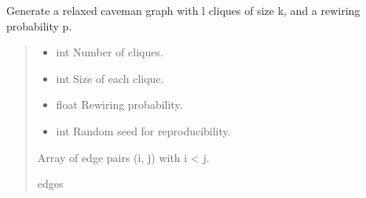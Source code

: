 \documentclass[letterpaper,10pt,english]{sphinxmanual}
\begin{document}
\begin{fulllineitems}
\label{\detokenize{graphem:graphem.generators.generate_relaxed_caveman}}
\pysigstartsignatures
{}
\pysigstopsignatures
\sphinxAtStartPar
Generate a relaxed caveman graph with l cliques of size k,
and a rewiring probability p.
\begin{quote}\begin{description}
\begin{itemize}
\item {} 
\sphinxAtStartPar
{} \textendash{} int
Number of cliques.

\item {} 
\sphinxAtStartPar
{} \textendash{} int
Size of each clique.

\item {} 
\sphinxAtStartPar
{} \textendash{} float
Rewiring probability.

\item {} 
\sphinxAtStartPar
{} \textendash{} int
Random seed for reproducibility.

\end{itemize}

\sphinxAtStartPar
\begin{description}
\sphinxAtStartPar
Array of edge pairs (i, j) with i \textless{} j.

\end{description}


\sphinxAtStartPar
edges

\end{description}\end{quote}

\end{fulllineitems}
\end{document}
